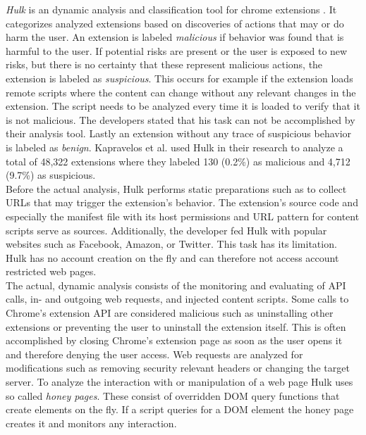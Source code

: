 	\textit{Hulk} is an dynamic analysis and classification tool for chrome extensions \cite{184485}. It categorizes analyzed extensions based on discoveries of actions that may or do harm the user. An extension is labeled \textit{malicious} if behavior was found that is harmful to the user. If potential risks are present or the user is exposed to new risks, but there is no certainty that these represent malicious actions, the extension is labeled as \textit{suspicious}. This occurs for example if the extension loads remote scripts where the content can change without any relevant changes in the extension. The script needs to be analyzed every time it is loaded to verify that it is not malicious. The developers stated that his task can not be accomplished by their analysis tool. Lastly an extension without any trace of suspicious behavior is labeled as \textit{benign}.  Kapravelos et al. used Hulk in their research to analyze a total of 48,322 extensions where they labeled 130 (0.2\%) as malicious and 4,712 (9.7\%) as suspicious. \\
	Before the actual analysis, Hulk performs static preparations such as to collect URLs that may trigger the extension's behavior. The extension's source code and especially the manifest file with its host permissions and URL pattern for content scripts serve as sources. Additionally, the developer fed Hulk with popular websites such as Facebook, Amazon, or Twitter. This task has its limitation. Hulk has no account creation on the fly and can therefore not access account restricted web pages. \\
	The actual, dynamic analysis consists of the monitoring and evaluating of API calls, in- and outgoing web requests, and injected content scripts. Some calls to Chrome's extension API are considered malicious such as uninstalling other extensions or preventing the user to uninstall the extension itself. This is often accomplished by closing Chrome's extension page as soon as the user opens it and therefore denying the user access. Web requests are analyzed for modifications such as removing security relevant headers or changing the target server. To analyze the interaction with or manipulation of a web page Hulk uses so called \textit{honey pages}. These consist of overridden DOM query functions that create elements on the fly. If a script queries for a DOM element the honey page creates it and monitors any interaction. 
	
